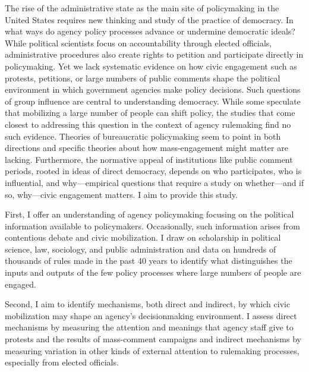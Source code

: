 The rise of the administrative state as the main site of policymaking in the United States requires new thinking and study of the practice of democracy. In what ways do agency policy processes advance or undermine democratic ideals? While political scientists focus on accountability through elected officials, administrative procedures also create rights to petition and participate directly in policymaking.  Yet we lack systematic evidence on how civic engagement such as protests, petitions, or large numbers of public comments shape the political environment in which government agencies make policy decisions. Such questions of group influence are central to understanding democracy. While some speculate that mobilizing a large number of people can shift policy, the studies that come closest to addressing this question in the context of agency rulemaking find no such evidence. Theories of bureaucratic policymaking seem to point in both directions and specific theories about how mass-engagement might matter are lacking. Furthermore, the normative appeal of institutions like public comment periods, rooted in ideas of direct democracy, depends on who participates, who is influential, and why---empirical questions that require a study on whether---and if so, why---civic engagement matters. I aim to provide this study.

First, I offer an understanding of agency policymaking focusing on the political information available to policymakers. Occasionally, such information arises from contentious debate and civic mobilization. I draw on scholarship in political science, law, sociology, and public administration and data on hundreds of thousands of rules made in the past 40 years to identify what distinguishes the inputs and outputs of the few policy processes where large numbers of people are engaged.

Second, I aim to identify mechanisms, both direct and indirect, by which civic mobilization may shape an agency's decisionmaking environment. I assess direct mechanisms by measuring the attention and meanings that agency staff give to protests and the results of mass-comment campaigns and indirect mechanisms by measuring variation in other kinds of external attention to rulemaking processes, especially from elected officials.

